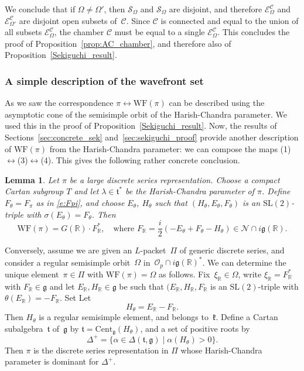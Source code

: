 \documentclass[10pt,leqno]{article}
\newtheorem{lemma}[equation]{Lemma}
\newcommand{\Cent}{\mathrm{Cent}}
\renewcommand{\O}{\mathcal O}
\newcommand{\R}{\mathbb R}
\newcommand{\N}{\mathcal N}
\renewcommand{\k}{\mathfrak k}
\renewcommand{\t}{\mathfrak t}
\newcommand{\g}{\mathfrak g}
\newcommand{\WF}{\mathrm{WF}}
\newcommand{\Op}{\O_p}
\newcommand{\ECom}{\mathcal{E}^{\mathcal{C}}_\Omega}
\begin{document}
We conclude that if $\Omega \neq \Omega'$, then $\mathcal{S}_\Omega$ and $\mathcal{S}_\Omega$ are disjoint, and therefore $\ECom$ and $\mathcal{E}^{\mathcal{C}}_{\Omega'}$ are disjoint open subsets of~$\mathcal{C}$. Since $\mathcal{C}$ is connected and equal to the union of all subsets $\mathcal{E}^{\mathcal{C}}_{\Omega}$, the chamber $\mathcal{C}$ must be equal to a single $\ECom$. This concludes the proof of Proposition~\ref{prop:AC_chamber}, and therefore also of Proposition~\ref{Sekiguchi_result}.


\subsubsection{A simple description of the wavefront set}\label{sec:alternate_WF}


As we saw the correspondence $\pi \leftrightarrow \WF(\pi)$ can be described using the asymptotic cone of the semisimple orbit of the Harish-Chandra parameter. We used this in the proof of Proposition~\ref{Sekiguchi_result}. Now, the results of Sections~\ref{sec:concrete_sek} and~\ref{sec:sekiguchi_proof} provide another description of $\WF(\pi)$ from the Harish-Chandra parameter: we can compose the maps (1)$\leftrightarrow$(3)$\leftrightarrow$(4). This gives the following rather concrete conclusion.

\begin{lemma}
  Let $\pi$ be a large discrete series representation.
Choose a compact Cartan subgroup $T$ and let $\lambda\in \t^*$ be the Harish-Chandra parameter of $\pi$.
Define $F_\theta=F_\pi$ as in \eqref{e:Fpi}, and choose  $E_\theta$, $H_\theta$ such that $(H_\theta,E_\theta,F_\theta)$ is an $\mathrm{SL}(2)$-triple with $\sigma(E_\theta)=F_\theta$.  Then
$$
\WF(\pi)=G(\R)\cdot F_\R^\ast, \quad \text{where $F_\R = \frac i2(-E_\theta+F_\theta-H_\theta)\in\N\cap i\g(\R)$.}
$$\end{lemma}
Conversely, assume we are given an $L$-packet~$\Pi$ of generic discrete series, and consider a regular semisimple orbit~$\Omega$ in~$\Op \cap i\g(\R)^\ast$. We can determine the unique element~$\pi \in \Pi$ with $\WF(\pi)=\Omega$ as follows. Fix~$\xi_\R \in \Omega$, write $\xi_\R=F_\R^\ast$ with $F_\R \in \g$ and let $E_\R, H_\R \in \g$ be such that $(E_\R, H_\R, F_\R$ is an  $\mathrm{SL}(2)$-triple with $\theta(E_\R)=-F_\R$. Set
Let
$$
H_\theta=E_\R-F_\R.
$$
Then $H_\theta$ is a regular semisimple element, and belongs to~$\k$.
Define a Cartan subalgebra~$\t$ of~$\g$ by $\t=\Cent_{\g}(H_\theta)$, and a set of positive roots by
$$
\Delta^+=\{\alpha\in\Delta(\t,\g)\mid  \alpha(H_\theta)>0\}.
$$
Then $\pi$ is the discrete series representation in $\Pi$ whose Harish-Chandra parameter is dominant for $\Delta^+$. 
\end{document}
